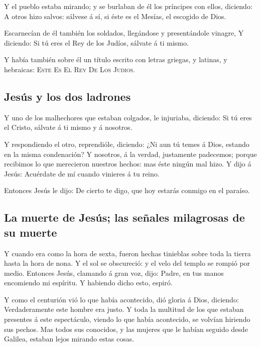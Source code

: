  Y el pueblo estaba mirando; y se burlaban de él los
príncipes con ellos, diciendo: A otros hizo salvos: sálvese á sí, si
éste es el Mesías, el escogido de Dios.

 Escarnecían de él también los soldados, llegándose y
presentándole vinagre,  Y diciendo: Si tú eres el Rey de
los Judíos, sálvate á ti mismo.

 Y había también sobre él un título escrito con letras
griegas, y latinas, y hebraicas: \textsc{Este} \textsc{Es} \textsc{El}
\textsc{Rey} \textsc{De} \textsc{Los} \textsc{Judios}.

\hypertarget{jesuxfas-y-los-dos-ladrones}{%
\subsection{Jesús y los dos
ladrones}\label{jesuxfas-y-los-dos-ladrones}}

 Y uno de los malhechores que estaban colgados, le
injuriaba, diciendo: Si tú eres el Cristo, sálvate á ti mismo y á
nosotros.

 Y respondiendo el otro, reprendióle, diciendo: ¿Ni aun
tú temes á Dios, estando en la misma condenación?  Y
nosotros, á la verdad, justamente padecemos; porque recibimos lo que
merecieron nuestros hechos: mas éste ningún mal hizo.  Y
dijo á Jesús: Acuérdate de mí cuando vinieres á tu reino.

 Entonces Jesús le dijo: De cierto te digo, que hoy
estarás conmigo en el paraíso.

\hypertarget{la-muerte-de-jesuxfas-las-seuxf1ales-milagrosas-de-su-muerte}{%
\subsection{La muerte de Jesús; las señales milagrosas de su
muerte}\label{la-muerte-de-jesuxfas-las-seuxf1ales-milagrosas-de-su-muerte}}

 Y cuando era como la hora de sexta, fueron hechas
tinieblas sobre toda la tierra hasta la hora de nona.  Y
el sol se obscureció: y el velo del templo se rompió por medio.
 Entonces Jesús, clamando á gran voz, dijo: Padre, en tus
manos encomiendo mi espíritu. Y habiendo dicho esto, espiró.

 Y como el centurión vió lo que había acontecido, dió
gloria á Dios, diciendo: Verdaderamente este hombre era justo.
 Y toda la multitud de los que estaban presentes á este
espectáculo, viendo lo que había acontecido, se volvían hiriendo sus
pechos.  Mas todos sus conocidos, y las mujeres que le
habían seguido desde Galilea, estaban lejos mirando estas cosas.

